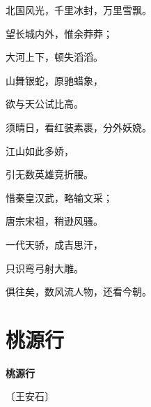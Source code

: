 \documentclass[12pt,UTF-8,openany,fontset=none]{ctexbook}
\begin{document}
    \vspace{18pt}  %

\begin{center}
    \begin{Large}

        北国风光，千里冰封，万里雪飘。

        望长城内外，惟余莽莽；

        大河上下，顿失滔滔。

        山舞银蛇，原驰蜡象，

        欲与天公试比高。

        须晴日，看红装素裹，分外妖娆。

        \vspace{18pt}  %

        江山如此多娇，

        引无数英雄竞折腰。

        惜秦皇汉武，略输文采；

        唐宗宋祖，稍逊风骚。

        一代天骄，成吉思汗，

        只识弯弓射大雕。

        俱往矣，数风流人物，还看今朝。

    \end{Large}

\end{center}

\vspace{8pt}
\clearpage

\section{桃源行}


\begin{center}
    {\bfseries 桃源行}

    \vspace{18pt}

    \begin{large}\xuwen
        〔王安石〕
    \end{large}

\end{center}

    \vspace{18pt}  %
\end{document}
